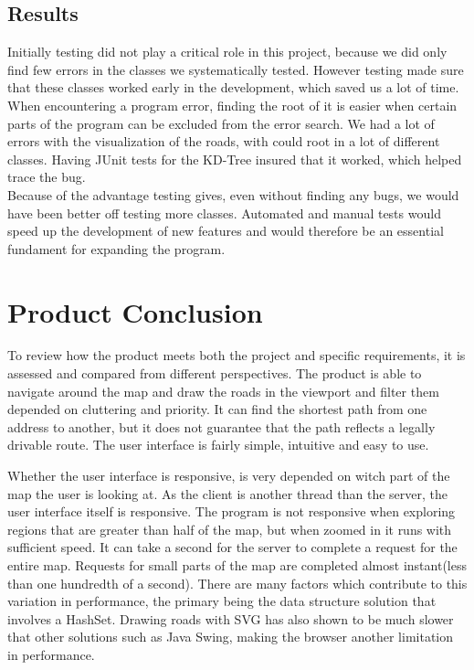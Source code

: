 \documentclass[a4paper,10pt,titlepage]{article}
\begin{document}
		\subsection{Results}\mbox{}
		Initially testing did not play a critical role in this project, because we did only find few errors in the classes we systematically tested. However testing made sure that these classes worked early in the development, which saved us a lot of time. When encountering a program error, finding the root of it is easier when certain parts of the program can be excluded from the error search. We had a lot of errors with the visualization of the roads, with could root in a lot of different classes. Having JUnit tests for the KD-Tree insured that it worked, which helped trace the bug.\\
		Because of the advantage testing gives, even without finding any bugs, we would have been better off testing more classes. Automated and manual tests would speed up the development of new features and would therefore be an essential fundament for expanding the program. 

			
	\newpage
	\section{Product Conclusion}\mbox{}
	To review how the product meets both the project and specific requirements, it is assessed and compared from different perspectives. The product is able to navigate around the map and draw the roads in the viewport and filter them depended on cluttering and priority. It can find the shortest path from one address to another, but it does not guarantee that the path reflects a legally drivable route. The user interface is fairly simple, intuitive and easy to use.

Whether the user interface is responsive, is very depended on witch part of the map the user is looking at. As the client is another thread than the server, the user interface itself is responsive. The program is not responsive when exploring regions that are greater than half of the map, but when zoomed in it runs with sufficient speed. It can take a second for the server to complete a request for the entire map. Requests for small parts of the map are completed almost instant(less than one hundredth of a second). There are many factors which contribute to this variation in performance, the primary being the data structure solution that involves a HashSet. Drawing roads with SVG has also shown to be much slower that other solutions such as Java Swing, making the browser another limitation in performance.
\end{document}
